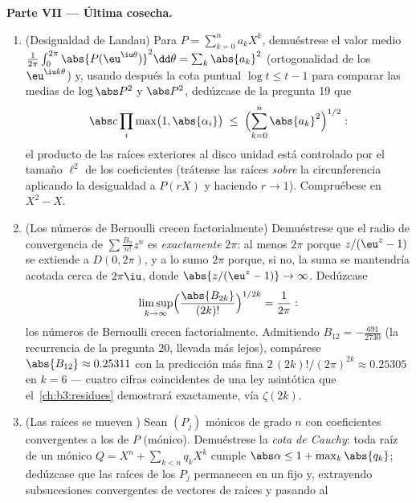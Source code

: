 \begin{problem}
\medskip
\noindent\textbf{Parte VII --- Última cosecha.}
\begin{enumerate}[resume]
  \item (Desigualdad de Landau) Para $P = \sum_{k=0}^na_kX^k$,
  demuéstrese el valor medio $\frac1{2\pi}\int_0^{2\pi}
        \abs{P(\eu^{\iu\theta})}^2\dd\theta =
        \sum_k\abs{a_k}^2$ (ortogonalidad de los $\eu^{\iu k\theta}$) y,
  usando después la cota puntual $\log t \leq t - 1$ para comparar las
  medias de $\log\abs P^2$ y $\abs P^2$, dedúzcase de la pregunta 19 que
        \[
        \abs c\prod_{i}\max\bigl(1, \abs{\alpha_i}\bigr)
        \;\leq\;
        \Bigl(\sum_{k=0}^{n}\abs{a_k}^2\Bigr)^{1/2} :
        \]
        el producto de las raíces exteriores al disco unidad está
        controlado por el tamaño $\ell^2$ de los coeficientes (trátense
        las raíces \emph{sobre} la circunferencia aplicando la
        desigualdad a $P(rX)$ y haciendo $r \to 1$). Compruébese en
        $X^2 - X$. \item (Los números de Bernoulli crecen
        factorialmente) Demuéstrese que el radio de convergencia de
        $\sum\frac{B_n}{n!}z^n$ es \emph{exactamente} $2\pi$: al menos
        $2\pi$ porque $z/(\eu^z - 1)$ se extiende
         a $D(0, 2\pi)$,
        y a lo sumo $2\pi$ porque, si no, la suma se mantendría acotada
        cerca de $2\pi\iu$, donde $\abs{z/(\eu^z-1)} \to \infty$.
        Dedúzcase
        \[
        \limsup_{k\to\infty}
        \Bigl(\frac{\abs{B_{2k}}}{(2k)!}\Bigr)^{1/2k}
        = \frac1{2\pi} :
        \]
        los números de Bernoulli crecen factorialmente. Admitiendo
        $B_{12}
        = -\frac{691}{2730}$ (la recurrencia de la pregunta 20, llevada
        más lejos), compárese $\abs{B_{12}} \approx 0.25311$ con la
        predicción más fina $2\,(2k)!/(2\pi)^{2k}
        \approx 0.25305$ en $k = 6$ --- cuatro cifras coincidentes de
        una ley asintótica que el~\cref{ch:b3:residues} demostrará
        exactamente, vía $\zeta(2k)$. \item (Las raíces se mueven
        ) Sean $(P_j)$
        mónicos de grado $n$ con coeficientes convergentes a los de $P$
        (mónico). Demuéstrese la \emph{cota de Cauchy}: toda raíz de un
        mónico $Q = X^n + \sum_{k<n}q_kX^k$ cumple
        $\abs\alpha \leq 1 + \max_k\abs{q_k}$; dedúzcase que las raíces
        de los $P_j$ permanecen en un
         fijo y, extrayendo
        subsucesiones convergentes de vectores de raíces y pasando al

\end{enumerate}
\end{problem}
